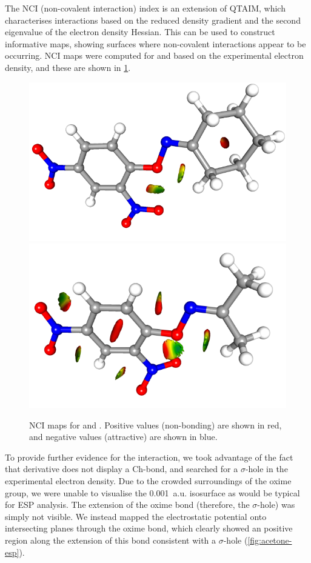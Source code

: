 \begin{refsection}
The NCI (non-covalent interaction) index is an extension of QTAIM, which characterises interactions based on the reduced density gradient and the second eigenvalue of the electron density Hessian.\autocite{Johnson2010a}
This can be used to construct informative maps, showing surfaces where non-covalent interactions appear to be occurring.
NCI maps were computed for  and  based on the experimental electron density, and these are shown in \ref{fig:NCI}.

\begin{figure}
	\centering
	\includegraphics[angle=90,width=0.35\columnwidth]{Figures/cyclohexanone-oxime-dnp-nci.png}
	\includegraphics[angle=90,width=0.35\columnwidth]{Figures/acetone-oxime-dnp-nci.png}
	\caption{NCI maps for  and . Positive values (non-bonding) are shown in red, and negative values (attractive) are shown in blue.}
	\label{fig:NCI}
\end{figure}

To provide further evidence for the interaction, we took advantage of the fact that derivative  does not display a Ch-bond, and searched for a $\sigma$-hole in the experimental electron density.
Due to the crowded surroundings of the oxime group, we were unable to visualise the 0.001~a.u. isosurface as would be typical for ESP analysis.
The extension of the oxime bond (therefore, the $\sigma$-hole) was simply not visible.
We instead mapped the electrostatic potential onto intersecting planes through the oxime bond, which clearly showed an positive region along the extension of this bond consistent with a $\sigma$-hole (\ref{fig:acetone-esp}).


\end{refsection}
